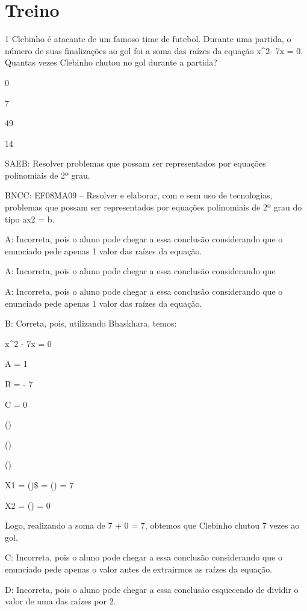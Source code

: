 {\section{Treino}

\num{1} Clebinho é atacante de um famoso time de futebol. Durante uma
partida, o número de suas finalizações ao gol foi a soma das raízes da
equação x^2- 7x = 0. Quantas vezes Clebinho chutou no gol durante a
partida?
\item 0
\item 7
\item 49
\item 14

SAEB: Resolver problemas que possam ser representados por equações
polinomiais de 2º grau.

BNCC: EF08MA09 -- Resolver e elaborar, com e sem uso de tecnologias,
problemas que possam ser representados por equações polinomiais de 2º
grau do tipo ax2 = b.

A: Incorreta, pois o aluno pode chegar a essa conclusão considerando que
o enunciado pede apenas 1 valor das raízes da equação.


A: Incorreta, pois o aluno pode chegar a essa conclusão considerando que



A: Incorreta, pois o aluno pode chegar a essa conclusão considerando que
o enunciado pede apenas 1 valor das raízes da equação.

B: Correta, pois, utilizando Bhaskhara, temos:

x^2 - 7x = 0

A = 1

B = - 7

C = 0

()

()

()

X1 = ()\$ = () = 7

X2 = () = 0

Logo, realizando a soma de 7 + 0 = 7, obtemos que Clebinho chutou 7
vezes ao gol.

C: Incorreta, pois o aluno pode chegar a essa conclusão considerando que
o enunciado pede apenas o valor antes de extrairmos as raízes da
equação.

D: Incorreta, pois o aluno pode chegar a essa conclusão esquecendo de
dividir o valor de uma das raízes por 2.

}
